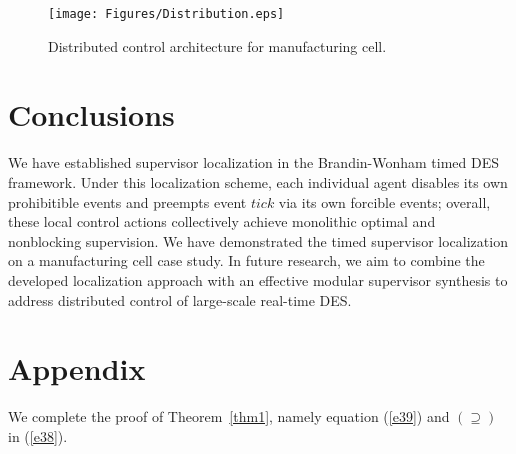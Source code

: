 \documentclass[twocolumn]{autart}
\begin{document}
\begin{figure}[!t]
\centering
    \texttt{[image: Figures/Distribution.eps]}
\caption{Distributed control architecture for manufacturing cell.}
\label{fig:distribution}
\end{figure}

\section{Conclusions} \label{sec:conclusion}

We have established supervisor localization in the Brandin-Wonham
timed DES framework. Under this localization scheme, each individual
agent disables its own prohibitible events and preempts event $tick$
via its own forcible events; overall, these local control actions
collectively achieve monolithic optimal and nonblocking supervision.
We have demonstrated the timed supervisor localization on a
manufacturing cell case study.  In future research, we
aim to combine the developed localization approach with an effective
modular supervisor synthesis to address distributed control of
large-scale real-time DES.





\appendix
\section{Appendix}

We complete the proof of Theorem~\ref{thm1}, namely
equation (\ref{e39}) and $(\supseteq)$ in (\ref{e38}).
\end{document}
